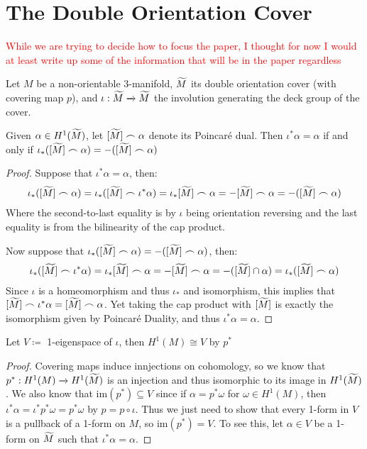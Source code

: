 \section{The Double Orientation Cover}

\textcolor{red}{While we are trying to decide how to focus the paper, I thought for now I would at least write up some of the information that will be in the paper regardless}

Let $M$ be a non-orientable 3-manifold, $\widetilde{M}$ its double orientation cover (with covering map $p$), and $\iota: \widetilde{M} \xrightarrow[]{} \widetilde{M}$ the involution generating the deck group of the cover.

\begin{lem}
Given $\alpha \in H^1(\widetilde{M})$, let $[\widetilde{M}] \frown \alpha$ denote its Poincar\'e dual. Then $\iota^*\alpha = \alpha$ if and only if $\iota_*([\widetilde{M}] \frown \alpha) = -([\widetilde{M}] \frown \alpha)$ 
\end{lem}
\begin{proof}
Suppose that $\iota^*\alpha = \alpha$, then:
\begin{align*}
    \iota_*([\widetilde{M}] \frown \alpha) = \iota_*([\widetilde{M}] \frown \iota^*\alpha) = \iota_*[\widetilde{M}] \frown \alpha = -[\widetilde{M}] \frown \alpha = -([\widetilde{M}] \frown \alpha)
\end{align*}
Where the second-to-last equality is by $\iota$ being orientation reversing and the last equality is from the bilinearity of the cap product.

Now suppose that $\iota_*([\widetilde{M}] \frown \alpha) = -([\widetilde{M}] \frown \alpha)$, then:
\begin{align*}
    \iota_*([\widetilde{M}] \frown \iota^*\alpha) = \iota_*[\widetilde{M}] \frown \alpha = -[\widetilde{M}] \frown \alpha = -([\widetilde{M}] \cap \alpha) = \iota_*([\widetilde{M}] \frown \alpha)
\end{align*}
Since $\iota$ is a homeomorphism and thus $\iota_*$ and isomorphism, this implies that $[\widetilde{M}] \frown \iota^*\alpha = [\widetilde{M}] \frown \alpha$. Yet taking the cap product with $[\widetilde{M}]$ is exactly the isomorphism given by Poincar\'e Duality, and thus $\iota^*\alpha = \alpha$.
\end{proof}

\begin{lem}
Let $V \coloneqq$ 1-eigenspace of $\iota$, then $H^1(M) \cong V$ by $p^*$
\end{lem}
\begin{proof}
Covering maps induce innjections on cohomology, so we know that $p^*: H^1(M) \xrightarrow[]{} H^1(\widetilde{M})$ is an injection and thus isomorphic to its image in $H^1(\widetilde{M})$. We also know that im$(p^*) \subseteq V$ since if $\alpha = p^*\omega$ for $\omega \in H^1(M)$, then $\iota ^*\alpha = \iota^*p^* \omega = p^* \omega$ by $p = p \circ \iota$. Thus we just need to show that every 1-form in $V$ is a pullback of a 1-form on $M$, so im$(p^*) = V$. To see this, let $\alpha \in V$ be a 1-form on $\widetilde{M}$ such that $\iota^* \alpha = \alpha$.
\end{proof}
